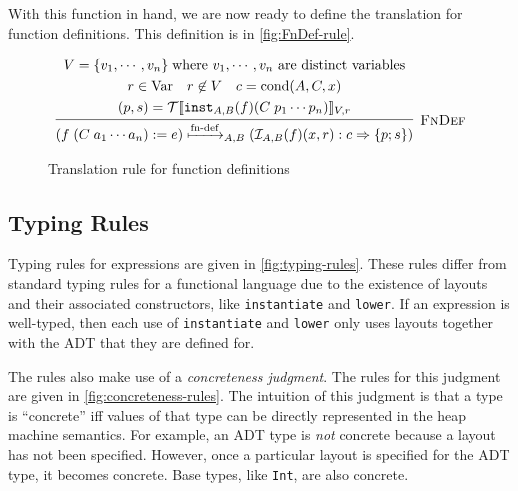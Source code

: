 With this function in hand, we are now ready to define the translation for \tool function definitions. This
definition is in \autoref{fig:FnDef-rule}.

\begin{figure}
\[
\begin{array}{c}
  \labinfer[FnDef]{(f\; (C\; a_1 \cdots a_n) := e) \defstep{A,B} (\mathcal{I}_{A,B}(f)(x, r) : c \Ra \{p ; s\})}
    {\begin{gathered}
          \VarSet = \{ v_1 , \cdots , v_n \}\; \textnormal{where $v_1, \cdots, v_n$ are distinct variables}
      \\  r \in \Var
      ~~~ r \not\in \VarSet
      ~~~ c = \cond(A, C, x)
      \\  (p, s) = \Tsem{\instantiateS{A,B}{f}(C\; p_1 \cdots p_n)}{\VarSet, r}
     \end{gathered}
    }
\end{array}
\]
\caption{Translation rule for function definitions}
\label{fig:FnDef-rule}
\end{figure}


\subsection{Typing Rules}

Typing rules for \tool expressions are given in
\autoref{fig:typing-rules}. These rules differ from standard typing
rules for a functional language due to the existence of layouts and
their associated constructors, like \verb|instantiate| and
\verb|lower|. If an expression is well-typed, then each use of
\verb|instantiate| and \verb|lower| only uses layouts together with
the ADT that they are defined for.

The rules also make use of a \textit{concreteness judgment}. The rules
for this judgment are given in \autoref{fig:concreteness-rules}. The
intuition of this judgment is that a type is ``concrete'' iff values
of that type can be directly represented in the heap machine
semantics. For example, an ADT type is \textit{not} concrete because a
layout has not been specified. However, once a particular layout is
specified for the ADT type, it becomes concrete. Base types, like
\verb|Int|, are also concrete.

